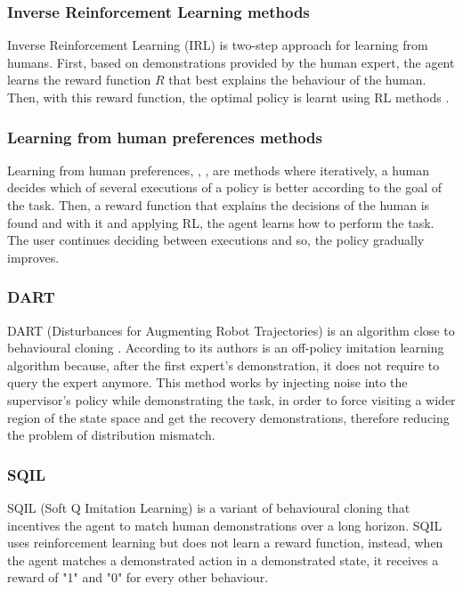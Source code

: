 \subsubsection*{Inverse Reinforcement Learning methods}
Inverse Reinforcement Learning (IRL) is two-step approach for learning from humans. First, based on demonstrations provided by the human expert, the agent learns the reward function $R$ that best explains the behaviour of the human. Then, with this reward function, the optimal policy is learnt using RL methods \cite{inverse-reinforcement-learning}.

\subsubsection*{Learning from human preferences methods}
Learning from human preferences, \cite{learning-from-human-preferences:2017}, \cite{learning-from-human-preferences:2018},  are methods where iteratively, a human decides which of several executions of a policy is better according to the goal of the task. Then, a reward function that explains the decisions of the human is found and with it and applying RL, the agent learns how to perform the task. The user continues deciding between executions and so,  the policy gradually improves.


\subsubsection*{DART}
DART (Disturbances for Augmenting Robot Trajectories) \cite{DART-Laskey:2017} is an algorithm close to behavioural cloning \cite{Behavioural-Cloning-Pomerleau:1991}. According to its authors is an off-policy imitation learning algorithm because, after the first expert's demonstration, it does not require to query the expert anymore. This method works by injecting noise into the supervisor's policy while demonstrating the task, in order to force visiting a wider region of the state space and get the recovery demonstrations, therefore reducing the problem of distribution mismatch.

\subsubsection*{SQIL}
SQIL (Soft Q Imitation Learning) \cite{SQIL-Reddy-Dragan-Levine:2019} is a variant of behavioural cloning that incentives the agent to match human demonstrations over a long horizon. SQIL uses reinforcement learning but does not learn a reward function, instead, when the agent matches a demonstrated action in a demonstrated state, it receives a reward of "1" and "0" for every other behaviour.

